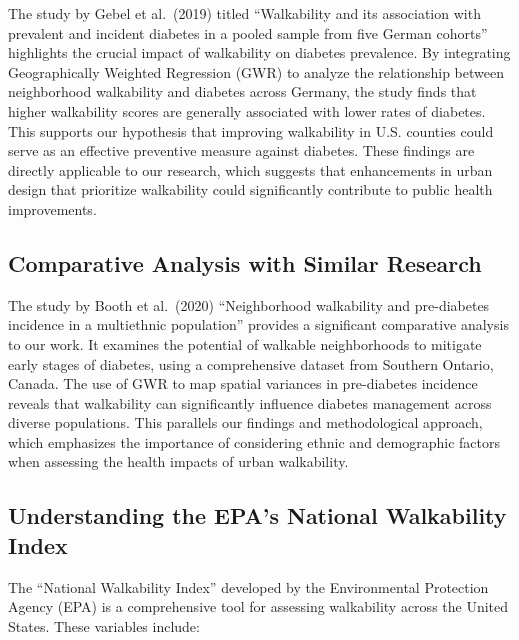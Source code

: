 \documentclass[
]{article}
\begin{document}
The study by Gebel et al.~(2019) titled ``Walkability and its
association with prevalent and incident diabetes in a pooled sample from
five German cohorts'' highlights the crucial impact of walkability on
diabetes prevalence. By integrating Geographically Weighted Regression
(GWR) to analyze the relationship between neighborhood walkability and
diabetes across Germany, the study finds that higher walkability scores
are generally associated with lower rates of diabetes. This supports our
hypothesis that improving walkability in U.S. counties could serve as an
effective preventive measure against diabetes. These findings are
directly applicable to our research, which suggests that enhancements in
urban design that prioritize walkability could significantly contribute
to public health improvements.

\subsection{Comparative Analysis with Similar
Research}\label{comparative-analysis-with-similar-research}

The study by Booth et al.~(2020) ``Neighborhood walkability and
pre-diabetes incidence in a multiethnic population'' provides a
significant comparative analysis to our work. It examines the potential
of walkable neighborhoods to mitigate early stages of diabetes, using a
comprehensive dataset from Southern Ontario, Canada. The use of GWR to
map spatial variances in pre-diabetes incidence reveals that walkability
can significantly influence diabetes management across diverse
populations. This parallels our findings and methodological approach,
which emphasizes the importance of considering ethnic and demographic
factors when assessing the health impacts of urban walkability.

\subsection{Understanding the EPA's National Walkability
Index}\label{understanding-the-epas-national-walkability-index}

The ``National Walkability Index'' developed by the Environmental
Protection Agency (EPA) is a comprehensive tool for assessing
walkability across the United States. These variables include:
\end{document}
